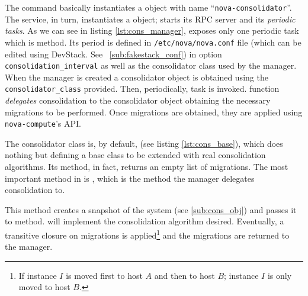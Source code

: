 The command basically instantiates a  object with name ``\texttt{nova-consolidator}''. The service, in turn, instantiates a  object; starts its RPC server and its \emph{periodic tasks}. As we can see in listing \ref{lst:cons_manager},  exposes only one periodic task which is  method.
Its period is defined in \texttt{/etc/nova/nova.conf} file (which can be edited using DevStack. See ~\ref{sub:fakestack_conf}) in option \texttt{consolidation\_interval} as well as the consolidator class used by the manager. When the manager is created a consolidator object is obtained using the \texttt{consolidator\_class} provided. Then, periodically,  task is invoked.  function \emph{delegates} consolidation to the consolidator object obtaining the necessary migrations to be performed. Once migrations are obtained, they are applied using \texttt{nova-compute}'s API.

The consolidator class is, by default,  (see listing \ref{lst:cons_base}), which does nothing but defining a base class to be extended with real consolidation algorithms. Its  method, in fact, returns an empty list of migrations. The most important method in  is , which is the method the manager delegates consolidation to.

This method creates a snapshot of the system (see \ref{sub:cons_obj}) and passes it to  method.  will implement the consolidation algorithm desired. Eventually, a transitive closure on migrations is applied\footnote{If instance $I$ is moved first to host $A$ and then to host $B$; instance $I$ is only moved to host $B$.} and the migrations are returned to the manager.

